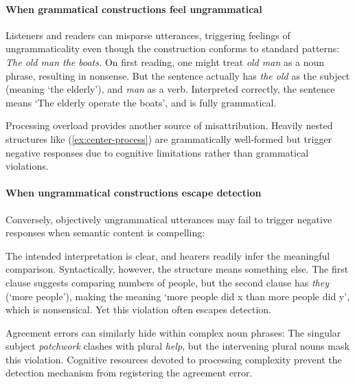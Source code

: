 \documentclass[12pt,letterpaper]{article}
\begin{document}
\paragraph{When grammatical constructions feel ungrammatical}

Listeners and readers can misparse utterances, triggering feelings of ungrammaticality even though the construction conforms to standard patterns:
\ea
\textit{The old man the boats.} \autocite{ritchie1984}\label{ex:the-old-mislabel}
\z
On first reading, one might treat \textit{old man} as a noun phrase, resulting in nonsense. But the sentence actually has \textit{the old} as the subject (meaning `the elderly'), and \textit{man} as a verb. Interpreted correctly, the sentence means `The elderly operate the boats', and is fully grammatical.

Processing overload provides another source of misattribution. Heavily nested structures like (\ref{ex:center-process}) are grammatically well-formed but trigger negative responses due to cognitive limitations rather than grammatical violations.

\paragraph{When ungrammatical constructions escape detection}

Conversely, objectively ungrammatical utterances may fail to trigger negative responses when semantic content is compelling:

\label{ex:negative-ads-escape}
\z

The intended interpretation is clear, and hearers readily infer the meaningful comparison. Syntactically, however, the structure means something else. The first clause suggests comparing numbers of people, but the second clause has \textit{they} (`more people'), making the meaning `more people did x than more people did y', which is nonsensical. Yet this violation often escapes detection.

Agreement errors can similarly hide within complex noun phrases:
\z
The singular subject \textit{patchwork} clashes with plural \textit{help}, but the intervening plural nouns mask this violation. Cognitive resources devoted to processing complexity prevent the detection mechanism from registering the agreement error.
\end{document}
